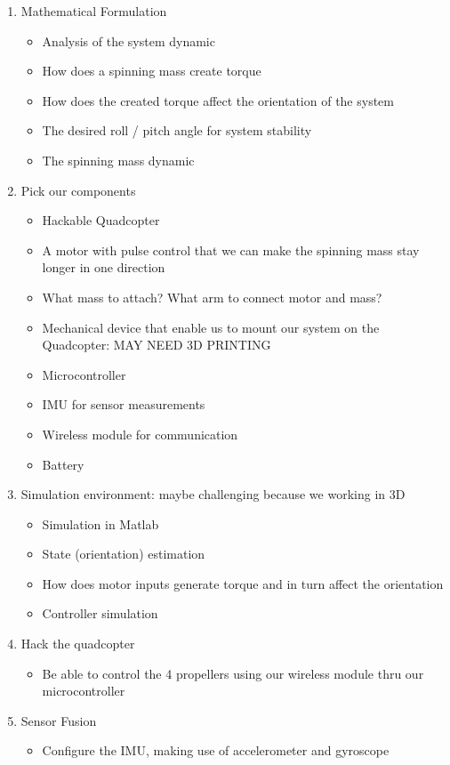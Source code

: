 \documentclass[11pt]{article}
\begin{document}
\begin{enumerate}
\item Mathematical Formulation
\begin{itemize}
\item Analysis of the system dynamic
\item How does a spinning mass create torque
\item How does the created torque affect the orientation of the system
\item The desired roll / pitch angle for system stability
\item The spinning mass dynamic
\end{itemize}
\item Pick our components
\begin{itemize}
\item Hackable Quadcopter
\item A motor with pulse control that we can make the spinning mass stay longer in one direction
\item What mass to attach? What arm to connect motor and mass?
\item Mechanical device that enable us to mount our system on the Quadcopter: MAY NEED 3D PRINTING
\item Microcontroller
\item IMU for sensor measurements
\item Wireless module for communication
\item Battery
\end{itemize}
\item Simulation environment: maybe challenging because we working in 3D
\begin{itemize}
\item Simulation in Matlab
\item State (orientation) estimation
\item How does motor inputs generate torque and in turn affect the orientation
\item Controller simulation
\end{itemize}
\item Hack the quadcopter
\begin{itemize}
\item Be able to control the 4 propellers using our wireless module thru our microcontroller
\end{itemize}
\item Sensor Fusion
\begin{itemize}
\item Configure the IMU, making use of accelerometer and gyroscope

\end{itemize}
\end{enumerate}
\end{document}
